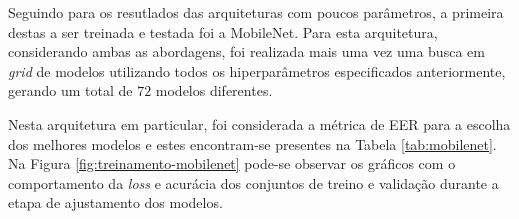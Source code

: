 Seguindo para os resutlados das arquiteturas com poucos parâmetros, a primeira destas a ser treinada e testada foi a MobileNet. Para esta arquitetura, considerando ambas as abordagens, foi realizada mais uma vez uma busca em \emph{grid} de modelos utilizando todos os hiperparâmetros especificados anteriormente, gerando um total de $72$ modelos diferentes.

Nesta arquitetura em particular, foi considerada a métrica de EER para a escolha dos melhores modelos e estes encontram-se presentes na Tabela \ref{tab:mobilenet}. Na Figura \ref{fig:treinamento-mobilenet} pode-se observar os gráficos com o comportamento da \emph{loss} e acurácia dos conjuntos de treino e validação durante a etapa de ajustamento dos modelos.

\begin{table}[h!]
\centering
\caption{Detalhamento dos melhores modelos obtidos com a arquitetura MobileNet para cada uma das abordagens consideradas neste trabalho.}
\label{tab:mobilenet}
\end{table}

